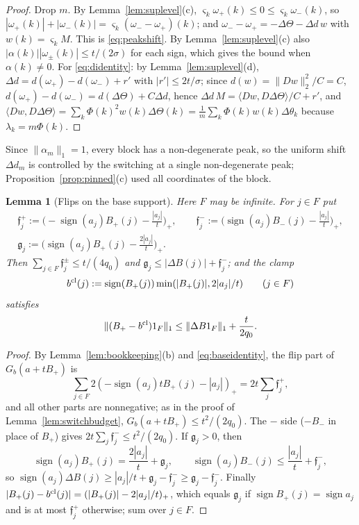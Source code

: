 \documentclass[10pt]{amsart}
\newtheorem{lemma}[theorem]{Lemma}
\theoremstyle{definition}
\theoremstyle{remark}
\newcommand{\sgn}{\operatorname{sign}}
\newcommand{\ip}[2]{\langle #1,#2\rangle}
\begin{document}
\begin{proof}
Drop $m$.  By Lemma~\ref{lem:suplevel}(c), $\varsigma_k\omega_+(k)\le0\le
\varsigma_k\omega_-(k)$, so $|\omega_+(k)|+|\omega_-(k)|=\varsigma_k(\omega_-
-\omega_+)(k)$; and $\omega_--\omega_+=-\Delta\Theta-\Delta d\,w$ with
$w(k)=\varsigma_kM$.  This is \eqref{eq:peakshift}.  By
Lemma~\ref{lem:suplevel}(c) also $|\alpha(k)||\omega_\pm(k)|\le t/(2\sigma)$
for each sign, which gives the bound when $\alpha(k)\ne0$.  For
\eqref{eq:didentity}: by Lemma~\ref{lem:suplevel}(d), $\Delta d=d(\omega_+)-
d(\omega_-)+r'$ with $|r'|\le2t/\sigma$; since $d(w)=\|Dw\|_2^2/C=C$,
$d(\omega_+)-d(\omega_-)=d(\Delta\Theta)+C\Delta d$, hence $\Delta d\,M=
\ip{Dw}{D\Delta\Theta}/C+r'$, and $\ip{Dw}{D\Delta\Theta}=\sum_k\Phi(k)^2w(k)
\Delta\Theta(k)=\frac1m\sum_k\Phi(k)w(k)\Delta\theta_k$ because
$\lambda_k=m\Phi(k)$.
\end{proof}

Since $\|\alpha_m\|_1=1$, every block has a non-degenerate peak, so the
uniform shift $\Delta d_m$ is controlled by the switching at a single
non-degenerate peak; Proposition~\ref{prop:pinned}(c) used all
coordinates of the block.

\begin{lemma}[Flips on the base support]\label{lem:flip}
Here $F$ may be infinite.  For $j\in F$ put
\begin{gather*}
 \mathfrak f^+_j:=\Big(-\sgn(a_j)B_+(j)-\frac{|a_j|}t\Big)_+,\qquad
 \mathfrak f^-_j:=\Big(\sgn(a_j)B_-(j)-\frac{|a_j|}t\Big)_+,\\
 \mathfrak g_j:=\Big(\sgn(a_j)B_+(j)-\frac{2|a_j|}t\Big)_+ .
\end{gather*}
Then $\sum_{j\in F}\mathfrak f^\pm_j\le t/(4q_0)$ and $\mathfrak g_j\le
|\Delta B(j)|+\mathfrak f^-_j$; and the clamp
\[
 b^{\rm cl}(j):=\sgn(B_+(j))\min(|B_+(j)|,2|a_j|/t)\qquad(j\in F)
\]
satisfies
\[
 \|(B_+-b^{\rm cl})1_F\|_1\le\|\Delta B1_F\|_1+\frac t{2q_0}.
\]
\end{lemma}

\begin{proof}
By Lemma~\ref{lem:bookkeeping}(b) and \eqref{eq:baseidentity}, the flip
part of $G_b(a+tB_+)$ is
\[
 \sum_{j\in F}2(-\sgn(a_j)tB_+(j)-|a_j|)_+=2t\sum_j\mathfrak f^+_j,
\]
and all other parts are nonnegative; as in the
proof of Lemma~\ref{lem:switchbudget}, $G_b(a+tB_+)\le t^2/(2q_0)$.  The
$-$ side ($-B_-$ in place of $B_+$) gives $2t\sum_j\mathfrak f^-_j\le
t^2/(2q_0)$.  If $\mathfrak g_j>0$, then
\[
 \sgn(a_j)B_+(j)=\frac{2|a_j|}t+\mathfrak g_j,\qquad\sgn(a_j)B_-(j)\le
 \frac{|a_j|}t+\mathfrak f^-_j,
\]
so $\sgn(a_j)\Delta B(j)\ge|a_j|/t+\mathfrak g_j-\mathfrak f^-_j\ge
\mathfrak g_j-\mathfrak f^-_j$.  Finally $|B_+(j)-b^{\rm cl}(j)|=(|B_+(j)|-2|a_j|/t)_+$,
which equals $\mathfrak g_j$ if $\sgn B_+(j)=\sgn a_j$ and is at most
$\mathfrak f^+_j$ otherwise; sum over $j\in F$.
\end{proof}
\end{document}
